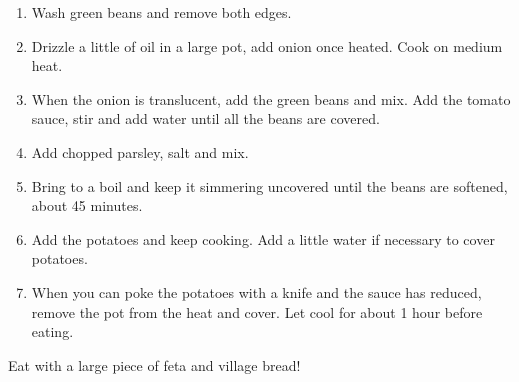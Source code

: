 \begin{enumerate}
    \item Wash green beans and remove both edges.
    \item Drizzle a little of oil in a large pot, add onion once heated. Cook on medium heat.
    \item When the onion is translucent, add the green beans and mix. Add the tomato sauce, stir and add water until all the beans are covered.
    \item Add chopped parsley, salt and mix.
    \item Bring to a boil and keep it simmering uncovered until the beans are softened, about 45 minutes.
    \item Add the potatoes and keep cooking. Add a little water if necessary to cover potatoes.
    \item When you can poke the potatoes with a knife and the sauce has reduced, remove the pot from the heat and cover. Let cool for about 1 hour before eating.
\end{enumerate}

Eat with a large piece of feta and village bread!

